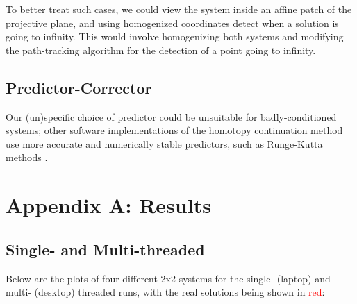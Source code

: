 \documentclass[a4paper]{article}
\theoremstyle{definition}
\theoremstyle{definition}
\theoremstyle{remark}
\theoremstyle{definition}
\begin{document}
To better treat such cases, we could view the system inside an affine patch of the projective plane, and using homogenized coordinates detect when a solution is going to infinity. This would involve homogenizing both systems and modifying the path-tracking algorithm for the detection of a point going to infinity.

\subsection{Predictor-Corrector}

Our (un)specific choice of predictor could be unsuitable for badly-conditioned systems; other software implementations of the homotopy continuation method use more accurate and numerically stable predictors, such as Runge-Kutta methods
\cite{HomotopyContinuation.jl}.

\section{Appendix A: Results}

\subsection{Single- and Multi-threaded}

Below are the plots of four different 2x2 systems for the single- (laptop) and multi- (desktop) threaded runs, with the real solutions being shown in
\textcolor{red}{red}:
\end{document}
